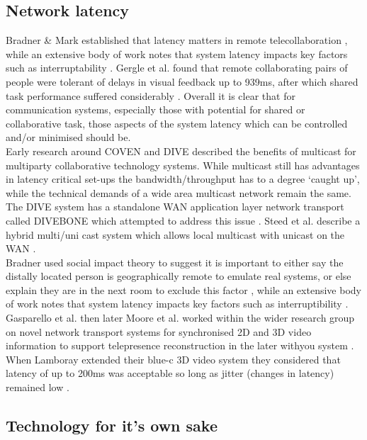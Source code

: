               \subsection{Network latency}
            Bradner \& Mark established that latency matters in remote telecollaboration \cite{Bradner:2002:WDM:587078.587110}, while an extensive body of work notes that system latency impacts key factors such as interruptability \cite{Avrahami2007}. Gergle et al. found that remote collaborating pairs of people were tolerant of delays in visual feedback up to 939ms, after which shared task performance suffered considerably \cite{Gergle2006}. Overall it is clear that for communication systems, especially those with potential for shared or collaborative task, those aspects of the system latency which can be controlled and/or minimised should be.\\
             Early research around COVEN and DIVE described the benefits of multicast for multiparty collaborative technology systems. While multicast still has advantages in latency critical set-ups the bandwidth/throughput has to a degree `caught up', while the technical demands of a wide area multicast network remain the same. The DIVE system has a standalone WAN application layer network transport called DIVEBONE which attempted to address this issue \cite{Greenhalgh2001a}. Steed et al. describe a hybrid multi/uni cast system which allows local multicast with unicast on the WAN \cite{Greenhalgh2001}.\\
              Bradner used social impact theory to suggest  it is important to either say the distally located person is geographically remote to emulate real systems, or else explain they are in the next room to exclude this factor \cite{Bradner:2002:WDM:587078.587110}, while an extensive body of work notes that system latency impacts key factors such as interruptibility \cite{Avrahami2007}.\\
         Gasparello et al. \cite{Gasparello:2011in} then later Moore et al. \cite{Moore:2010jt} worked within the wider research group on novel network transport systems for synchronised 2D and 3D video information to support telepresence reconstruction in the later withyou system \cite{Roberts2015}. \\
       When Lamboray extended their blue-c 3D video system they considered that latency of up to 200ms was acceptable so long as jitter (changes in latency) remained low \cite{Park1999, lamboray2005data}.
       \subsection{Technology for it's own sake}
       

